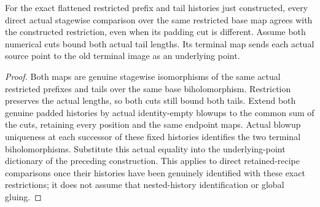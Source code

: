 \begin{theorem}
\label{hir:sharp-actual-padded-restriction-direct-comparison}
\leanok
For the exact flattened restricted prefix and tail histories just constructed,
every direct actual stagewise comparison over the same restricted base map
agrees with the constructed restriction, even when its padding cut is different.
Assume both numerical cuts bound both actual tail lengths. Its terminal map sends
each actual source point to the old terminal image as an underlying point.
\end{theorem}
\begin{proof}
Both maps are genuine stagewise isomorphisms of the same actual restricted
prefixes and tails over the same base biholomorphism. Restriction preserves
the actual lengths, so both cuts still bound both tails. Extend both genuine
padded histories by actual identity-empty blowups to the common sum of the
cuts, retaining every position and the same endpoint maps. Actual blowup
uniqueness at each successor of these fixed histories identifies the two
terminal biholomorphisms. Substitute this actual
equality into the underlying-point dictionary of the preceding construction.
This applies to direct retained-recipe comparisons once their histories have
been genuinely identified with these exact restrictions; it does not assume
that nested-history identification or global gluing.
\end{proof}
